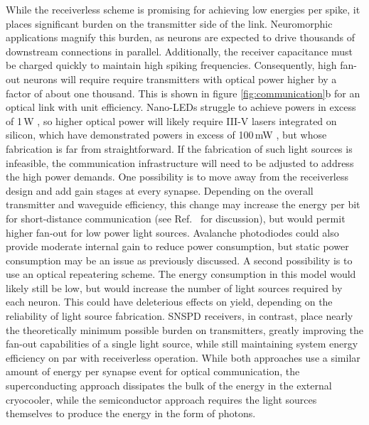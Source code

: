 \documentclass[twocolumn]{article}
\begin{document}
While the receiverless scheme is promising for achieving low energies per spike, it places significant burden on the transmitter side of the link. Neuromorphic applications magnify this burden, as neurons are expected to drive thousands of downstream connections in parallel. Additionally, the receiver capacitance must be charged quickly to maintain high spiking frequencies. Consequently, high fan-out neurons will require require transmitters with optical power higher by a factor of about one thousand. This is shown in figure \ref{fig:communication}b for an optical link with unit efficiency. Nano-LEDs struggle to achieve powers in excess of 1\,\textmu W \cite{romeira2019physical}, so higher optical power will likely require III-V lasers integrated on silicon, which have demonstrated powers in excess of 100\,mW \cite{zhou2015chip}, but whose fabrication is far from straightforward. If the fabrication of such light sources is infeasible, the communication infrastructure will need to be adjusted to address the high power demands. One possibility is to move away from the receiverless design and add gain stages at every synapse. Depending on the overall transmitter and waveguide efficiency, this change may increase the energy per bit for short-distance communication (see Ref.\ \cite{miller2017attojoule} for discussion), but would permit higher fan-out for low power light sources. Avalanche photodiodes could also provide moderate internal gain to reduce power consumption, but static power consumption may be an issue as previously discussed. A second possibility is to use an optical repeatering scheme. The energy consumption in this model would likely still be low, but would increase the number of light sources required by each neuron. This could have deleterious effects on yield, depending on the reliability of light source fabrication. SNSPD receivers, in contrast, place nearly the theoretically minimum possible burden on transmitters, greatly improving the fan-out capabilities of a single light source, while still maintaining system energy efficiency on par with receiverless operation. While both approaches use a similar amount of energy per synapse event for optical communication, the superconducting approach dissipates the bulk of the energy in the external cryocooler, while the semiconductor approach requires the light sources themselves to produce the energy in the form of photons.
\end{document}
